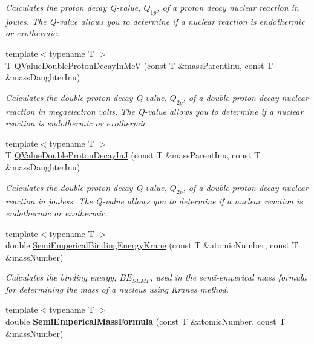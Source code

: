 \begin{DoxyCompactItemize}
\begin{DoxyCompactList}\small\item\em Calculates the proton decay Q-\/value, $Q_{1p}$, of a proton decay nuclear reaction in joules. The Q-\/value allows you to determine if a nuclear reaction is endothermic or exothermic. \end{DoxyCompactList}\item 
{\footnotesize template$<$typename T $>$ }\\T \hyperlink{group___q_value_ga4a57c8901e92918f08bee52493b81c59}{Q\+Value\+Double\+Proton\+Decay\+In\+MeV} (const T \&mass\+Parent\+Inu, const T \&mass\+Daughter\+Inu)
\begin{DoxyCompactList}\small\item\em Calculates the double proton decay Q-\/value, $Q_{2p}$, of a double proton decay nuclear reaction in megaelectron volts. The Q-\/value allows you to determine if a nuclear reaction is endothermic or exothermic. \end{DoxyCompactList}\item 
{\footnotesize template$<$typename T $>$ }\\T \hyperlink{group___q_value_ga64a3867f65de5586feab99527bb03d31}{Q\+Value\+Double\+Proton\+Decay\+InJ} (const T \&mass\+Parent\+Inu, const T \&mass\+Daughter\+Inu)
\begin{DoxyCompactList}\small\item\em Calculates the double proton decay Q-\/value, $Q_{2p}$, of a double proton decay nuclear reaction in jouless. The Q-\/value allows you to determine if a nuclear reaction is endothermic or exothermic. \end{DoxyCompactList}\item 
{\footnotesize template$<$typename T $>$ }\\double \hyperlink{group___semi_empirical_mass_formula_ga99c5a87be2c76d3fa4852654c3fd59a9}{Semi\+Emperical\+Binding\+Energy\+Krane} (const T \&atomic\+Number, const T \&mass\+Number)
\begin{DoxyCompactList}\small\item\em Calculates the binding energy, $BE_{SEMF}$, used in the semi-\/emperical mass formula for determining the mass of a nucleus using Krane\textquotesingle{}s method. \end{DoxyCompactList}\item 
{\footnotesize template$<$typename T $>$ }\\double {\bfseries Semi\+Emperical\+Mass\+Formula} (const T \&atomic\+Number, const T \&mass\+Number)

\end{DoxyCompactItemize}
